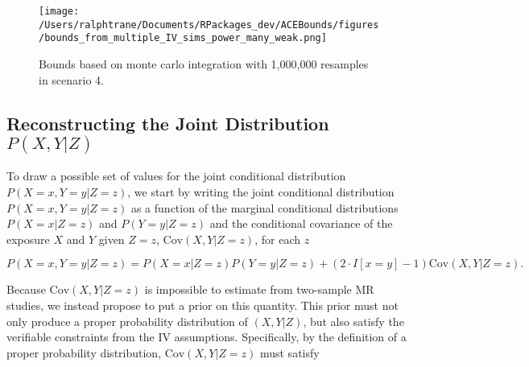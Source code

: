 \documentclass[
]{article}
\theoremstyle{plain}
\begin{document}
\clearpage

\begin{sidewaysfigure}
  \centering
  \texttt{[image: /Users/ralphtrane/Documents/RPackages\_dev/ACEBounds/figures/bounds\_from\_multiple\_IV\_sims\_power\_many\_weak.png]}
  \caption{Bounds based on monte carlo integration with 1,000,000 resamples in scenario 4.}
  \label{fig:bounds_from_multiple_IV_sims_power_many_weak}
\end{sidewaysfigure}

\clearpage

\hypertarget{reconstructing-the-joint-distribution-px-y-z}{%
\subsection{\texorpdfstring{Reconstructing the Joint Distribution \(P(X, Y | Z)\) \label{appendix-quasi-bayesian-details}}{Reconstructing the Joint Distribution P(X, Y \textbar{} Z) }}\label{reconstructing-the-joint-distribution-px-y-z}}

To draw a possible set of values for the joint conditional distribution \(P(X = x, Y = y | Z = z)\), we start by writing the joint conditional distribution \(P(X = x, Y = y | Z = z)\) as a function of the marginal conditional distributions \(P(X = x | Z = z)\) and \(P(Y = y | Z = z)\) and the conditional covariance of the exposure \(X\) and \(Y\) given \(Z=z\), \(\text{Cov}(X, Y | Z = z)\), for each \(z\)

\begin{equation}
P(X = x, Y = y | Z = z) = P(X = x | Z = z)P(Y = y | Z = z) + (2\cdot I[x = y] - 1)\text{Cov}(X, Y | Z = z). \label{eq:cov-expression}
\end{equation}

Because \(\text{Cov}(X, Y | Z = z)\) is impossible to estimate from two-sample MR studies, we instead propose to put a prior on this quantity. This prior must not only produce a proper probability distribution of \((X,Y|Z)\), but also satisfy the verifiable constraints from the IV assumptions. Specifically, by the definition of a proper probability distribution, \(\text{Cov}(X, Y | Z = z)\) must satisfy
\end{document}
